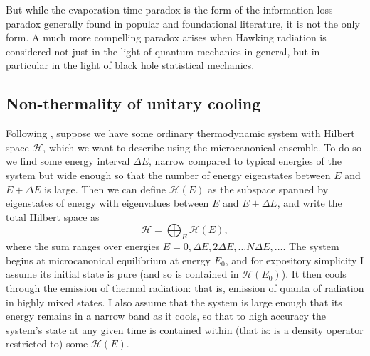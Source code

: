 \documentclass{article}
\newcommand{\mc}[1]{\ensuremath{\mathcal{#1}}}
\newcommand{\be}{\begin{equation}}
\newcommand{\ee}{\end{equation}}
\begin{document}
But while the evaporation-time paradox is the form of the information-loss paradox generally found in popular and foundational literature, it is not the only form. A much more compelling paradox arises when Hawking radiation is considered not just in the light of quantum mechanics in general, but in particular in the light of black hole statistical mechanics.


\subsection{Non-thermality of unitary cooling} 

Following , suppose we have some ordinary thermodynamic system with Hilbert space $\mc{H}$, which we want to describe using the microcanonical ensemble. To do so we find some energy interval $\Delta E$, narrow compared to typical energies of the system but wide enough so that the number of energy eigenstates between $E$ and $E+\Delta E$ is large. Then we can define $\mc{H}(E)$ as the subspace spanned by eigenstates of energy with eigenvalues between $E$ and $E+\Delta E$, and write the total Hilbert space as
\be
\mc{H}=\bigoplus_E \mc{H}(E),
\ee
where the sum ranges over energies $E=0,\Delta E, 2 \Delta E, \ldots N \Delta E,\ldots$. The system begins at microcanonical equilibrium at energy $E_0$, and for expository simplicity I assume its initial state is pure (and so is contained in $\mc{H}(E_0)$). It then cools through the emission of thermal radiation: that is, emission of quanta of radiation in highly mixed states. I also assume that the system is large enough that its energy remains in a narrow band as it cools, so that to high accuracy the system's state at any given time is contained within (that is: is a density operator restricted to) some $\mc{H}(E)$.
\end{document}
